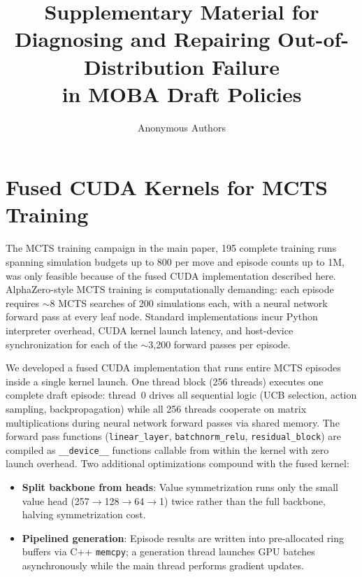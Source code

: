 \documentclass[journal]{IEEEtran}
\begin{document}
\title{Supplementary Material for\\ Diagnosing and Repairing Out-of-Distribution Failure\\ in MOBA Draft Policies}

\author{Anonymous Authors}

\maketitle

\section{Fused CUDA Kernels for MCTS Training}
\label{sec:cuda}

The MCTS training campaign in the main paper, 195 complete training runs spanning simulation budgets up to 800 per move and episode counts up to 1M, was only feasible because of the fused CUDA implementation described here. AlphaZero-style MCTS training is computationally demanding: each episode requires $\sim$8 MCTS searches of 200 simulations each, with a neural network forward pass at every leaf node. Standard implementations incur Python interpreter overhead, CUDA kernel launch latency, and host-device synchronization for each of the $\sim$3,200 forward passes per episode.

We developed a fused CUDA implementation that runs entire MCTS episodes inside a single kernel launch. One thread block (256 threads) executes one complete draft episode: thread~0 drives all sequential logic (UCB selection, action sampling, backpropagation) while all 256 threads cooperate on matrix multiplications during neural network forward passes via shared memory. The forward pass functions (\texttt{linear\_layer}, \texttt{batchnorm\_relu}, \texttt{residual\_block}) are compiled as \texttt{\_\_device\_\_} functions callable from within the kernel with zero launch overhead. Two additional optimizations compound with the fused kernel:
\begin{itemize}
    \item \textbf{Split backbone from heads}: Value symmetrization runs only the small value head (257$\to$128$\to$64$\to$1) twice rather than the full backbone, halving symmetrization cost.
    \item \textbf{Pipelined generation}: Episode results are written into pre-allocated ring buffers via C++ \texttt{memcpy}; a generation thread launches GPU batches asynchronously while the main thread performs gradient updates.
\end{itemize}
\end{document}
